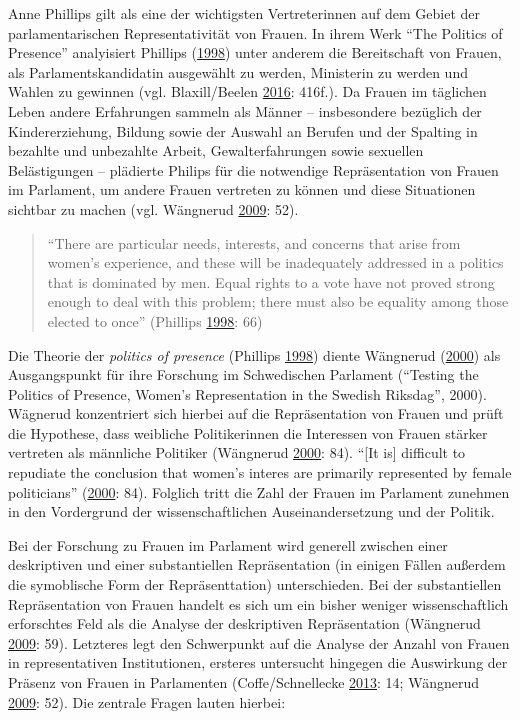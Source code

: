 \documentclass[12pt,ngerman,]{article}
\begin{document}
Anne Phillips gilt als eine der wichtigsten Vertreterinnen auf dem
Gebiet der parlamentarischen Representativität von Frauen. In ihrem Werk
\enquote{The Politics of Presence} analyisiert Phillips
(\protect\hyperlink{ref-phillips_1998}{1998}) unter anderem die
Bereitschaft von Frauen, als Parlamentskandidatin ausgewählt zu werden,
Ministerin zu werden und Wahlen zu gewinnen (vgl. Blaxill/Beelen
\protect\hyperlink{ref-blaxill_2016}{2016}: 416f.). Da Frauen im
täglichen Leben andere Erfahrungen sammeln als Männer -- insbesondere
bezüglich der Kindererziehung, Bildung sowie der Auswahl an Berufen und
der Spalting in bezahlte und unbezahlte Arbeit, Gewalterfahrungen sowie
sexuellen Belästigungen -- plädierte Philips für die notwendige
Repräsentation von Frauen im Parlament, um andere Frauen vertreten zu
können und diese Situationen sichtbar zu machen (vgl. Wängnerud
\protect\hyperlink{ref-wangnerud_2009}{2009}: 52).

\begin{quote}
\enquote{There are particular needs, interests, and concerns that arise
from women's experience, and these will be inadequately addressed in a
politics that is dominated by men. Equal rights to a vote have not
proved strong enough to deal with this problem; there must also be
equality among those elected to once} (Phillips
\protect\hyperlink{ref-phillips_1998}{1998}: 66)
\end{quote}

Die Theorie der \emph{politics of presence} (Phillips
\protect\hyperlink{ref-phillips_1998}{1998}) diente Wängnerud
(\protect\hyperlink{ref-wangnerud_2000}{2000}) als Ausgangspunkt für
ihre Forschung im Schwedischen Parlament (\enquote{Testing the Politics
of Presence, Women's Representation in the Swedish Riksdag}, 2000).
Wägnerud konzentriert sich hierbei auf die Repräsentation von Frauen und
prüft die Hypothese, dass weibliche Politikerinnen die Interessen von
Frauen stärker vertreten als männliche Politiker (Wängnerud
\protect\hyperlink{ref-wangnerud_2000}{2000}: 84). \enquote{{[}It is{]}
difficult to repudiate the conclusion that women's interes are primarily
represented by female politicians}
(\protect\hyperlink{ref-wangnerud_2000}{2000}: 84). Folglich tritt die
Zahl der Frauen im Parlament zunehmen in den Vordergrund der
wissenschaftlichen Auseinandersetzung und der Politik.

Bei der Forschung zu Frauen im Parlament wird generell zwischen einer
deskriptiven und einer substantiellen Repräsentation (in einigen Fällen
außerdem die symoblische Form der Repräsenttation) unterschieden. Bei
der substantiellen Repräsentation von Frauen handelt es sich um ein
bisher weniger wissenschaftlich erforschtes Feld als die Analyse der
deskriptiven Repräsentation (Wängnerud
\protect\hyperlink{ref-wangnerud_2009}{2009}: 59). Letzteres legt den
Schwerpunkt auf die Analyse der Anzahl von Frauen in representativen
Institutionen, ersteres untersucht hingegen die Auswirkung der Präsenz
von Frauen in Parlamenten (Coffe/Schnellecke
\protect\hyperlink{ref-coffe_2013}{2013}: 14; Wängnerud
\protect\hyperlink{ref-wangnerud_2009}{2009}: 52). Die zentrale Fragen
lauten hierbei:
\end{document}
